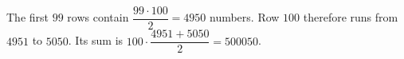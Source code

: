 The first $99$ rows contain $\dfrac{99\cdot100}{2}=4950$ numbers. Row $100$ therefore runs from $4951$ to $5050$. Its sum is $100\cdot\dfrac{4951+5050}{2}=\boxed{500050}$.
